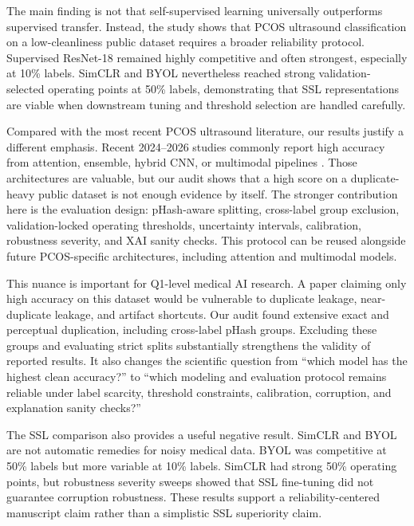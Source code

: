 \documentclass[pdflatex,sn-mathphys-num]{sn-jnl}
\theoremstyle{thmstyleone}
\theoremstyle{thmstyletwo}
\theoremstyle{thmstylethree}
\begin{document}
The main finding is not that self-supervised learning universally outperforms supervised transfer. Instead, the study shows that PCOS ultrasound classification on a low-cleanliness public dataset requires a broader reliability protocol. Supervised ResNet-18 remained highly competitive and often strongest, especially at 10\% labels. SimCLR and BYOL nevertheless reached strong validation-selected operating points at 50\% labels, demonstrating that SSL representations are viable when downstream tuning and threshold selection are handled carefully.

Compared with the most recent PCOS ultrasound literature, our results justify a different emphasis. Recent 2024--2026 studies commonly report high accuracy from attention, ensemble, hybrid CNN, or multimodal pipelines \cite{moral2024cystnet,ahmad2024smote,zhao2025automatic_recognition,sundari2025integrative_pcod,tiwari2026attention,saha2026pcosfusionnet,patil2026haren}. Those architectures are valuable, but our audit shows that a high score on a duplicate-heavy public dataset is not enough evidence by itself. The stronger contribution here is the evaluation design: pHash-aware splitting, cross-label group exclusion, validation-locked operating thresholds, uncertainty intervals, calibration, robustness severity, and XAI sanity checks. This protocol can be reused alongside future PCOS-specific architectures, including attention and multimodal models.

This nuance is important for Q1-level medical AI research. A paper claiming only high accuracy on this dataset would be vulnerable to duplicate leakage, near-duplicate leakage, and artifact shortcuts. Our audit found extensive exact and perceptual duplication, including cross-label pHash groups. Excluding these groups and evaluating strict splits substantially strengthens the validity of reported results. It also changes the scientific question from ``which model has the highest clean accuracy?'' to ``which modeling and evaluation protocol remains reliable under label scarcity, threshold constraints, calibration, corruption, and explanation sanity checks?''

The SSL comparison also provides a useful negative result. SimCLR and BYOL are not automatic remedies for noisy medical data. BYOL was competitive at 50\% labels but more variable at 10\% labels. SimCLR had strong 50\% operating points, but robustness severity sweeps showed that SSL fine-tuning did not guarantee corruption robustness. These results support a reliability-centered manuscript claim rather than a simplistic SSL superiority claim.
\end{document}
